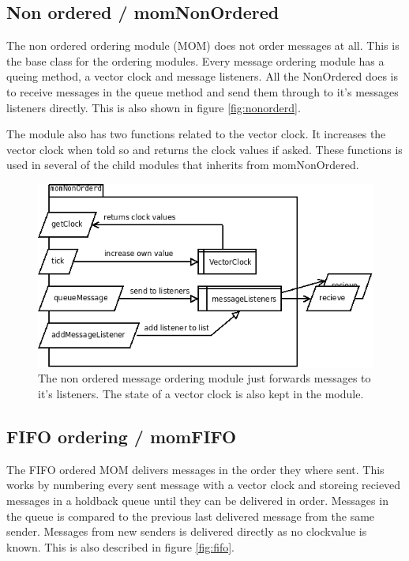 \documentclass[english]{article}
\begin{document}
\subsection{Non ordered / momNonOrdered}
The non ordered ordering module (MOM) does not order messages at all. This is the base class for the ordering modules. Every message ordering module has a queing method, a vector clock and message listeners. All the NonOrdered does is to receive messages in the queue method and send them through to it's messages listeners directly. This is also shown in figure \vref{fig:nonorderd}.

The module also has two functions related to the vector clock. It increases the vector clock when told so and returns the clock values if asked. These functions is used in several of the child modules that inherits from momNonOrdered.

\begin{figure}
\includegraphics[width=\textwidth]{momNonOrderd.png}
\caption{The non ordered message ordering module just forwards messages to it's listeners. The state of a vector clock is also kept in the module.}
\label{fig:nonorderd}
\end{figure}

\subsection{FIFO ordering / momFIFO}
The FIFO ordered MOM delivers messages in the order they where sent. This works by numbering every sent message with a vector clock and storeing recieved messages in a holdback queue until they can be delivered in order. Messages in the queue is compared to the previous last delivered message from the same sender. Messages from new senders is delivered directly as no clockvalue is known. This is also described in figure \vref{fig:fifo}.
\end{document}

